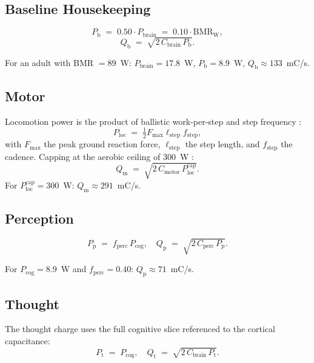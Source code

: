 \documentclass[11pt,twocolumn,a4paper]{article}
\theoremstyle{definition}
\theoremstyle{remark}
\newcommand{\Qb}{Q_{\mathrm{b}}}
\newcommand{\Qm}{Q_{\mathrm{m}}}
\newcommand{\Qp}{Q_{\mathrm{p}}}
\newcommand{\Qt}{Q_{\mathrm{t}}}
\newcommand{\Pb}{P_{\mathrm{b}}}
\newcommand{\Pp}{P_{\mathrm{p}}}
\newcommand{\Pt}{P_{\mathrm{t}}}
\newcommand{\Pbrain}{P_{\mathrm{brain}}}
\newcommand{\Pcog}{P_{\mathrm{cog}}}
\newcommand{\Cbrain}{C_{\mathrm{brain}}}
\newcommand{\Cmotor}{C_{\mathrm{motor}}}
\newcommand{\Cperc}{C_{\mathrm{perc}}}
\begin{document}
\subsection{Baseline Housekeeping}

\begin{equation}
\Pb \;=\; 0.50 \cdot \Pbrain \;=\; 0.10 \cdot \mathrm{BMR}_{\mathrm{W}},
\end{equation}
\begin{equation}
\Qb \;=\; \sqrt{2 \, \Cbrain \, \Pb}.
\end{equation}

For an adult with BMR $= 89$~W: $\Pbrain = 17.8$~W, $\Pb = 8.9$~W,
$\Qb \approx 133$~mC/s.

\subsection{Motor}

Locomotion power is the product of ballistic work-per-step and step
frequency \citep{cavagna1977, kram1990}:
\begin{equation}
P_{\mathrm{loc}} \;=\; \tfrac{1}{2} F_{\max} \ell_{\mathrm{step}} f_{\mathrm{step}},
\end{equation}
with $F_{\max}$ the peak ground reaction force, $\ell_{\mathrm{step}}$
the step length, and $f_{\mathrm{step}}$ the cadence. Capping at
the aerobic ceiling of $300$~W \citep{jones2011}:
\begin{equation}
\Qm \;=\; \sqrt{2 \, \Cmotor \, P_{\mathrm{loc}}^{\mathrm{cap}}}.
\end{equation}
For $P_{\mathrm{loc}}^{\mathrm{cap}} = 300$~W: $\Qm \approx 291$~mC/s.

\subsection{Perception}

\begin{equation}
\Pp \;=\; f_{\mathrm{perc}} \, \Pcog,
\quad
\Qp \;=\; \sqrt{2 \, \Cperc \, \Pp}.
\end{equation}

For $\Pcog = 8.9$~W and $f_{\mathrm{perc}} = 0.40$: $\Qp \approx
71$~mC/s.

\subsection{Thought}

The thought charge uses the full cognitive slice referenced to the
cortical capacitance:
\begin{equation}
\Pt \;=\; \Pcog,
\quad
\Qt \;=\; \sqrt{2 \, \Cbrain \, \Pt}.
\end{equation}
\end{document}

